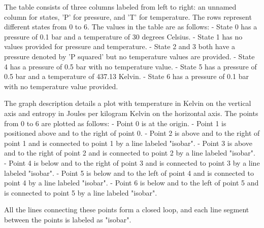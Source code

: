 The table consists of three columns labeled from left to right: an unnamed column for states, 'P' for pressure, and 'T' for temperature. The rows represent different states from 0 to 6. The values in the table are as follows:
- State 0 has a pressure of 0.1 bar and a temperature of 30 degrees Celsius.
- State 1 has no values provided for pressure and temperature.
- State 2 and 3 both have a pressure denoted by 'P squared' but no temperature values are provided.
- State 4 has a pressure of 0.5 bar with no temperature value.
- State 5 has a pressure of 0.5 bar and a temperature of 437.13 Kelvin.
- State 6 has a pressure of 0.1 bar with no temperature value provided.

The graph description details a plot with temperature in Kelvin on the vertical axis and entropy in Joules per kilogram Kelvin on the horizontal axis. The points from 0 to 6 are plotted as follows:
- Point 0 is at the origin.
- Point 1 is positioned above and to the right of point 0.
- Point 2 is above and to the right of point 1 and is connected to point 1 by a line labeled "isobar".
- Point 3 is above and to the right of point 2 and is connected to point 2 by a line labeled "isobar".
- Point 4 is below and to the right of point 3 and is connected to point 3 by a line labeled "isobar".
- Point 5 is below and to the left of point 4 and is connected to point 4 by a line labeled "isobar".
- Point 6 is below and to the left of point 5 and is connected to point 5 by a line labeled "isobar".

All the lines connecting these points form a closed loop, and each line segment between the points is labeled as "isobar".